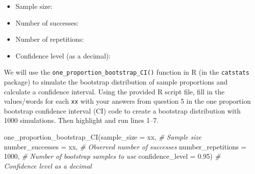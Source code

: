 \documentclass[
]{report}
\newenvironment{Shaded}{\begin{snugshade}}{\end{snugshade}}
\newcommand{\AttributeTok}[1]{\textcolor[rgb]{0.77,0.63,0.00}{#1}}
\newcommand{\CommentTok}[1]{\textcolor[rgb]{0.56,0.35,0.01}{\textit{#1}}}
\newcommand{\DecValTok}[1]{\textcolor[rgb]{0.00,0.00,0.81}{#1}}
\newcommand{\FloatTok}[1]{\textcolor[rgb]{0.00,0.00,0.81}{#1}}
\newcommand{\FunctionTok}[1]{\textcolor[rgb]{0.00,0.00,0.00}{#1}}
\newcommand{\NormalTok}[1]{#1}
\providecommand{\tightlist}{%
  \setlength{\itemsep}{0pt}\setlength{\parskip}{0pt}}
\begin{document}
\begin{itemize}
\tightlist
\item
  Sample size:
\end{itemize}

\vspace{.1in}

\begin{itemize}
\tightlist
\item
  Number of successes:
\end{itemize}

\vspace{.1in}

\begin{itemize}
\tightlist
\item
  Number of repetitions:
\end{itemize}

\vspace{.1in}

\begin{itemize}
\tightlist
\item
  Confidence level (as a decimal):
\end{itemize}

\vspace{.1in}

We will use the \texttt{one\_proportion\_bootstrap\_CI()} function in R (in the \texttt{catstats} package) to simulate the bootstrap distribution of sample proportions and calculate a confidence interval. Using the provided R script file, fill in the values/words for each \texttt{xx} with your answers from question 5 in the one proportion bootstrap confidence interval (CI) code to create a bootstrap distribution with 1000 simulations. Then highlight and run lines 1--7.

\begin{Shaded}
\begin{Highlighting}[]
\FunctionTok{one\_proportion\_bootstrap\_CI}\NormalTok{(}\AttributeTok{sample\_size =}\NormalTok{ xx, }\CommentTok{\# Sample size}
                    \AttributeTok{number\_successes =}\NormalTok{ xx, }\CommentTok{\# Observed number of successes}
                    \AttributeTok{number\_repetitions =} \DecValTok{1000}\NormalTok{, }\CommentTok{\# Number of bootstrap samples to use}
                    \AttributeTok{confidence\_level =} \FloatTok{0.95}\NormalTok{) }\CommentTok{\# Confidence level as a decimal}
\end{Highlighting}
\end{Shaded}
\end{document}
